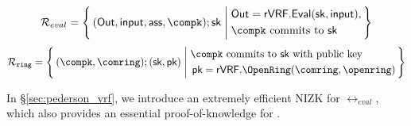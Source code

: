 %
\def\tmpAA{\Out = \rVRF.\Eval(\sk,\msg)}%
\def\tmpBB{\textrm{\compk commits to\ \sk}}%
$$ \rel_{eval} = \Setst{ (\Out, \msg, \aux, \compk); \sk}{
	\eprint{
		\tmpAA, \, \tmpBB
	}{
		\begin{aligned}
			&\tmpAA, \\
			&\tmpBB \\
		\end{aligned}
	}
} $$
\def\tmpAA{\textrm{\compk commits to $ \sk $ with public key\ }}%
\def\tmpBB{\rVRF.\OpenRing(\comring,\openring)}%
$$ \Rring = \Setst{ (\compk, \comring);(\sk,\pk) }{
	\eprint{
		\tmpAA \pk = \tmpBB
	}{
		\begin{aligned}
			&\tmpAA \\
			&\, \pk = \tmpBB \\
		\end{aligned}
	}
} $$


%
In \S\ref{sec:pederson_vrf}, we introduce an extremely efficient NIZK
for $ \rel_{eval} $, which also provides an essential proof-of-knowledge for \compk.


\endinput


Ring VRFs are firstly ring signatures broadly interpreted, in that they
prove an involved public key lies inside some commitment \comring to
the plausible signer set, known as the ring.
Anyone could compute \comring from this set of public keys.
%
At the same time, ring VRFs prove correct output of a PRF keyed by
the signer's actual secret key, and evaluated on a supplied message \msg,
which then links ring VRF signatures on the same \msg.

\smallskip
